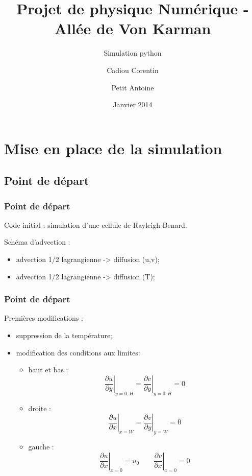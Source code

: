 \documentclass{beamer}
\title{Projet de physique Numérique - Allée de Von Karman}
\subtitle{Simulation python}
\author[Cadiou Corentin \and Petit Antoine] %
{Cadiou Corentin \and Petit Antoine}
\date{Janvier 2014}
\begin{document}
  \frame{\titlepage}

  \section{Mise en place de la simulation}
  \subsection{Point de départ}
  \begin{frame}
    \frametitle{Point de départ}
    Code initial : simulation d'une cellule de Rayleigh-Benard.

    Schéma d'advection :
    \begin{itemize}
      \item advection 1/2 lagrangienne -> diffusion (u,v);
      \item advection 1/2 lagrangienne -> diffusion (T);
    \end{itemize}
  \end{frame}
  \begin{frame}
    \frametitle{Point de départ}
    Premières modifications :
    \begin{itemize}
      \item<1-> suppression de la température;
      \item<2-> modification des conditions aux limites:
        \begin{itemize}
          \item<3-> haut et bas : 
            \[ \left. \frac{\partial u}{\partial y}\right|_{y=0,H} = 
            \left. \frac{\partial v}{\partial y}\right|_{y=0,H} = 0 \] 
          \item<4-> droite :
            \[ \left. \frac{\partial u}{\partial x}\right|_{x=W} = 
            \left. \frac{\partial v}{\partial y}\right|_{y=W} = 0 \]
          \item<5-> gauche :
            \[ \left. \frac{\partial u}{\partial x}\right|_{x=0} = u_0
            \qquad \left. \frac{\partial v}{\partial x}\right|_{x=0} = 0\]
        \end{itemize}
    \end{itemize}
  \end{frame}
\end{document}
